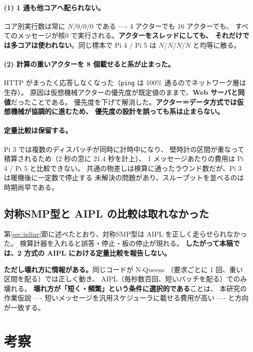 \documentclass[a4paper,11pt]{ltjsarticle}
\begin{document}
\paragraph{(1) 1 通も他コアへ配られない。}
コア別実行数は常に $N/0/0/0$ である ---- 4 アクターでも 16 アクターでも、
すべてのメッセージが核0 で実行される。\textbf{アクターをスレッドにしても、
それだけでは多コアは使われない}。同じ標本で Pi 4 / Pi 5 は $N/N/N/N$ と均等に散る。

\paragraph{(2) 計算の重いアクターを 8 個載せると系が止まった。}
HTTP がまったく応答しなくなった（\texttt{ping} は 100\% 通るのでネットワーク層は生存）。
原因は仮想機械アクターの優先度が既定値のままで、\textbf{Web サーバと同値}だったことである。
優先度を下げて解消した。\textbf{アクター＝データ方式では仮想機械が協調的に進むため、
優先度の設計を誤っても系は止まらない。}

\paragraph{定量比較は保留する。}Pi 3 では複数のディスパッチが同時に計時中になり、
壁時計の区間が重なって積算されるため（2 秒の窓に 21.4 秒を計上）、
1 メッセージあたりの費用は Pi 4 / Pi 5 と比較できない。
共通の物差しは検算に通ったラウンド数だが、Pi 3 は暖機後に一定数で停止する
未解決の問題があり、スループットを並べるのは時期尚早である。

\subsection{対称SMP型と AIPL の比較は取れなかった}
第\ref{sec:inline}節に述べたとおり、対称SMP型は AIPL を正しく走らせられなかった。
検算計器を入れると誤答・停止・板の停止が現れる。
\textbf{したがって本稿では、2 方式の AIPL における定量比較を報告しない。}

\textbf{ただし壊れ方に情報がある。}同じコードが N-Queens
（要求ごとに 1 回、重い区間を配る）では正しく動き、
AIPL（毎秒数百回、短いバッチを配る）でのみ壊れる。
\textbf{壊れ方が「短く・頻繁」という条件に選択的である}ことは、
本研究の作業仮説 ---- 短いメッセージを汎用スケジューラに載せる費用が高い ----
と方向が一致する。

\section{考察}\label{sec:disc}
\end{document}

